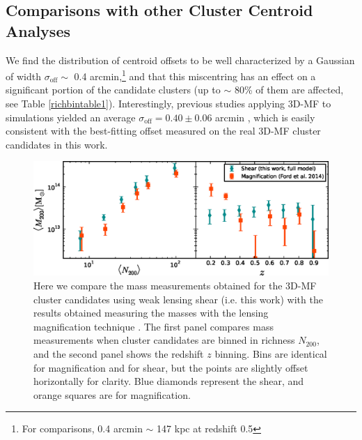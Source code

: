 
\subsection{Comparisons with other Cluster Centroid Analyses}
\label{sec:centres}
We find the distribution of centroid offsets to be well characterized by a Gaussian of width $\sigma_{\mathrm{off}} \sim$ 0.4 arcmin,\footnote[2]{For comparisons, 0.4 arcmin $\sim$ 147 kpc at redshift 0.5} and that this miscentring has an effect on a significant portion of the candidate clusters (up to $\sim$ 80\% of them are affected, see Table \ref{richbintable1}). Interestingly, previous studies applying \ac{3D-MF} to simulations yielded an average $\sigma_{\mathrm{off}}=0.40 \pm 0.06$ arcmin \citep[see Figure 1 in][]{Ford14}, which is easily consistent with the best-fitting offset measured on the real \ac{3D-MF} cluster candidates in this work.

\begin{figure}
\begin{center}
  \includegraphics[scale=0.9]{plots_ch4/shearVSmag_N200_z.eps}
  \caption[Comparison of Magnification and Shear Masses]{Here we compare the mass measurements obtained for the \ac{3D-MF} cluster candidates using weak lensing shear (i.e. this work) with the results obtained measuring the masses with the lensing magnification technique \citep[the $N_{200}$ estimates from that work, ][are used in this plot for the purposes of comparison]{Ford14}. The first panel compares mass measurements when cluster candidates are binned in richness $N_{200}$, and the second panel shows the redshift $z$ binning. Bins are identical for magnification and for shear, but the points are slightly offset horizontally for clarity. Blue diamonds represent the shear, and orange squares are for magnification.}
\label{plot:magshear}
\end{center}
\end{figure}

